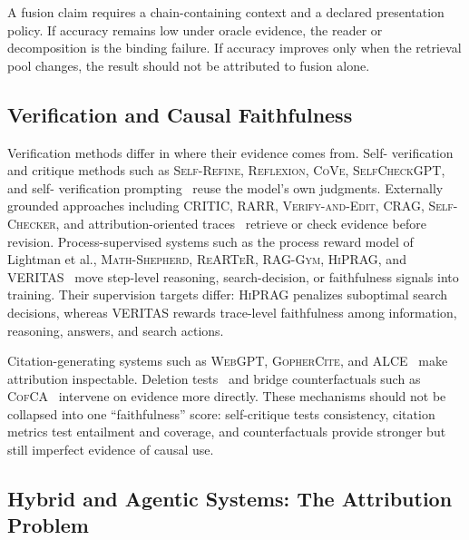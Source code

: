 \documentclass[manuscript,review]{acmart}
\theoremstyle{definition}
\theoremstyle{plain}
\theoremstyle{remark}
\begin{document}
A fusion claim requires a chain-containing context and a declared
presentation policy. If accuracy remains low under oracle evidence, the
reader or decomposition is the binding failure. If accuracy improves only
when the retrieval pool changes, the result should not be attributed to
fusion alone.

\subsection{Verification and Causal Faithfulness}
\label{subsec:methods_faithfulness}

Verification methods differ in where their evidence comes from. Self-
verification and critique methods such as \textsc{Self-Refine},
\textsc{Reflexion}, \textsc{CoVe}, \textsc{SelfCheckGPT}, and self-
verification prompting~\cite{madaan2023selfrefine,shinn2023reflexion,dhuliawala2024cove,manakul2023selfcheckgpt,weng2023selfverification}
reuse the model's own judgments. Externally grounded approaches including
\textsc{CRITIC}, \textsc{RARR}, \textsc{Verify-and-Edit},
\textsc{CRAG}, \textsc{Self-Checker}, and attribution-oriented traces~\cite{gou2024critic,gao2023rarr,zhao2023verifyedit,yan2024crag,li2024selfchecker,li2023attribution}
retrieve or check evidence before revision. Process-supervised systems such
as the process reward model of Lightman et al., \textsc{Math-Shepherd},
\textsc{ReARTeR}, \textsc{RAG-Gym}, \textsc{HiPRAG}, and
\textsc{VERITAS}~\cite{lightman2024process,wang2023mathshepherd,sun2025rearter,xiong2025raggym,wu2025hiprag,xu2025veritas}
move step-level reasoning, search-decision, or faithfulness signals into
training. Their supervision targets differ: \textsc{HiPRAG} penalizes
suboptimal search decisions, whereas \textsc{VERITAS} rewards trace-level
faithfulness among information, reasoning, answers, and search actions.

Citation-generating systems such as \textsc{WebGPT}, \textsc{GopherCite},
and \textsc{ALCE}~\cite{nakano2021webgpt,menick2022gophercite,gao2023alce}
make attribution inspectable. Deletion tests~\cite{liu2023evaluating,xu2024docnli}
and bridge counterfactuals such as \textsc{CofCA}~\cite{wu2024cofca}
intervene on evidence more directly. These mechanisms should not be collapsed
into one ``faithfulness'' score: self-critique tests consistency, citation
metrics test entailment and coverage, and counterfactuals provide stronger
but still imperfect evidence of causal use.

\subsection{Hybrid and Agentic Systems: The Attribution Problem}
\label{subsec:methods_joint}
\end{document}
